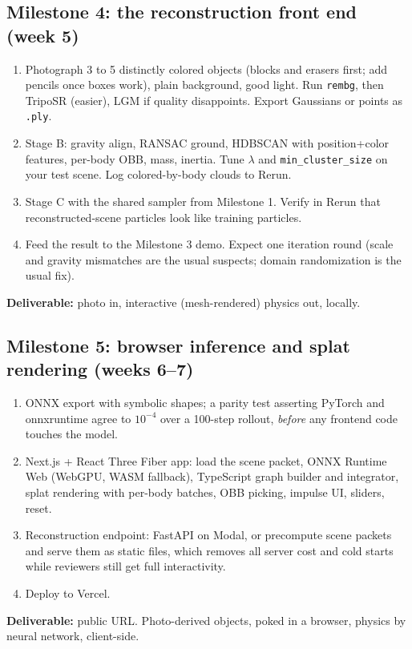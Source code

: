 \documentclass[11pt]{article}
\begin{document}
\subsection{Milestone 4: the reconstruction front end (week 5)}
\begin{enumerate}[itemsep=2pt]
  \item Photograph 3 to 5 distinctly colored objects (blocks and erasers first; add pencils once boxes work), plain background, good light. Run \texttt{rembg}, then TripoSR (easier), LGM if quality disappoints. Export Gaussians or points as \texttt{.ply}.
  \item Stage B: gravity align, RANSAC ground, HDBSCAN with position+color features, per-body OBB, mass, inertia. Tune $\lambda$ and \texttt{min\_cluster\_size} on your test scene. Log colored-by-body clouds to Rerun.
  \item Stage C with the shared sampler from Milestone 1. Verify in Rerun that reconstructed-scene particles look like training particles.
  \item Feed the result to the Milestone 3 demo. Expect one iteration round (scale and gravity mismatches are the usual suspects; domain randomization is the usual fix).
\end{enumerate}
\textbf{Deliverable:} photo in, interactive (mesh-rendered) physics out, locally.

\subsection{Milestone 5: browser inference and splat rendering (weeks 6--7)}
\begin{enumerate}[itemsep=2pt]
  \item ONNX export with symbolic shapes; a parity test asserting PyTorch and onnxruntime agree to $10^{-4}$ over a 100-step rollout, \emph{before} any frontend code touches the model.
  \item Next.js + React Three Fiber app: load the scene packet, ONNX Runtime Web (WebGPU, WASM fallback), TypeScript graph builder and integrator, splat rendering with per-body batches, OBB picking, impulse UI, sliders, reset.
  \item Reconstruction endpoint: FastAPI on Modal, or precompute scene packets and serve them as static files, which removes all server cost and cold starts while reviewers still get full interactivity.
  \item Deploy to Vercel.
\end{enumerate}
\textbf{Deliverable:} public URL. Photo-derived objects, poked in a browser, physics by neural network, client-side.
\end{document}
